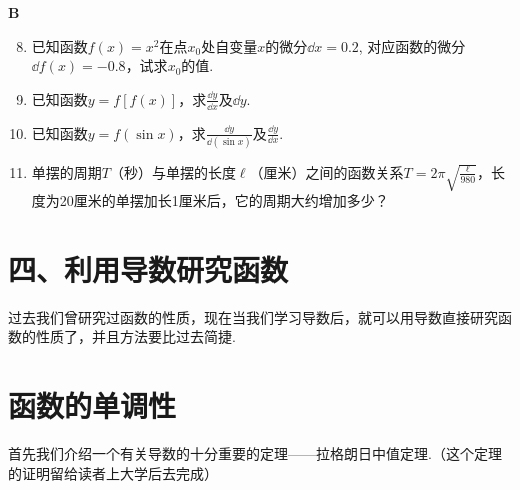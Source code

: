 \begin{center}
    \bfseries B
\end{center}

\begin{enumerate}\setcounter{enumi}{7}
    \item 已知函数$f(x)=x^2$在点$x_0$处自变量$x$的微分$\dd x=0.2$, 对应函数的微分$\dd f(x)=-0.8$，试求$x_0$的值.
    \item   已知函数$y=f[f(x)]$，求$\frac{\dd y}{\dd x}$及$\dd y$.
        \item   已知函数$y=f(\sin x)$，求$\frac{\dd y}{\dd(\sin x)}$及$\frac{\dd y}{\dd x}$.
        \item  单摆的周期$T$（秒）与单摆的长度$\ell$（厘米）之间的函数关系$T=2\pi\sqrt{\frac{\ell}{980}}$，长度为20厘米的单摆加长1厘米后，它的周期大约增加多少？
\end{enumerate}

\section*{四、利用导数研究函数}
过去我们曾研究过函数的性质，现在当我们学习导数后，就可以用导数直接研究函数的性质了，并且方法要比过去简捷.

\section{函数的单调性}
首先我们介绍一个有关导数的十分重要的定理——拉格朗日中值定理.（这个定理的证明留给读者上大学后去完成）











\begin{example}
    
\end{example}

\begin{solution}
    
\end{solution}





\begin{example}
    
\end{example}

\begin{solution}
    
\end{solution}




